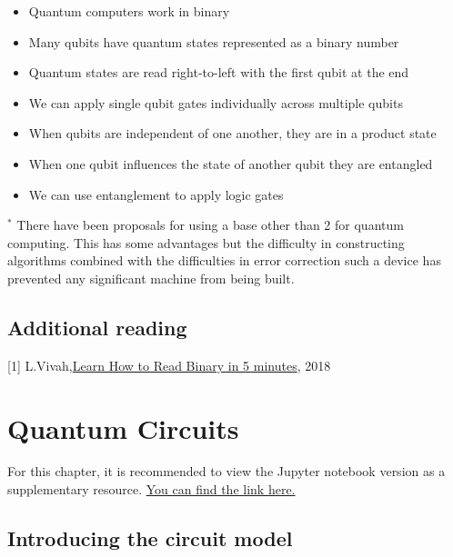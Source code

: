\documentclass{book}
\begin{document}
\begin{itemize}
    \item Quantum computers work in binary
    \item Many qubits have quantum states represented as a binary number
    \item Quantum states are read right-to-left with the first qubit at the end
    \item We can apply single qubit gates individually across multiple qubits 
    \item When qubits are independent of one another, they are in a product state
    \item When one qubit influences the state of another qubit they are entangled 
    \item We can use entanglement to apply logic gates
\end{itemize}

$^*$ There have been proposals for using a base other than 2 for quantum computing. This has some advantages but the difficulty in constructing algorithms combined with the difficulties in error correction such a device has prevented any significant machine from being built.

\section{Additional reading}

[1] L.Vivah,\href{https://medium.com/@LindaVivah/learn-how-to-read-binary-in-5-minutes-dac1feb991e}{Learn How to Read Binary in 5 minutes}, 2018
\chapter{Quantum Circuits}

For this chapter, it is recommended to view the Jupyter notebook version as a supplementary resource. \href{https://github.com/SolemnShark871/YAItQC/blob/main/Chapters/7_Quantum_circuits.ipynb}{You can find the link here.}
 

\section{Introducing the circuit model}
\end{document}
